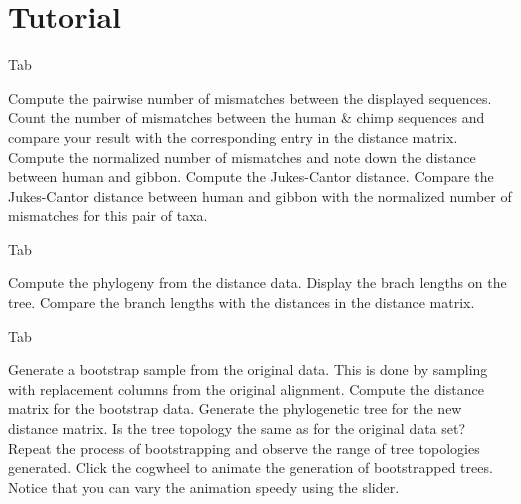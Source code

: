\section{Tutorial}
\begin{enumerate}
  \I {} Tab
  \begin{enumerate}
    \I Compute the pairwise number of mismatches between the displayed
    sequences. 
    \I Count the number of mismatches between the human \& chimp
    sequences and compare your result with the corresponding entry in
    the distance matrix.
    \I Compute the normalized number of mismatches and note down the
    distance between human and gibbon.
    \I Compute the Jukes-Cantor distance. Compare the Jukes-Cantor
    distance between human and gibbon with the normalized number of
    mismatches for this pair of taxa.
  \end{enumerate}
  \I {} Tab
  \begin{enumerate}
    \I Compute the phylogeny from the distance data.
    \I Display the brach lengths on the tree.
    \I Compare the branch lengths with the distances in the distance
    matrix. 
  \end{enumerate}
  \I {} Tab
  \begin{enumerate}
    \I Generate a bootstrap sample from the original data. This is
    done by sampling with replacement columns from the original
    alignment.
    \I Compute the distance matrix for the bootstrap data.
    \I Generate the phylogenetic tree for the new distance matrix. Is
    the tree topology the same as for the original data set?
    \I Repeat the process of bootstrapping and observe the range of
    tree topologies generated.
    \I Click the cogwheel to animate the generation of bootstrapped
    trees. Notice that you can vary the animation speedy using the
     slider. 
  \end{enumerate}
\end{enumerate}






